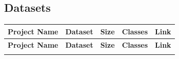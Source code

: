 \documentclass[12pt, titlepage]{article}
\begin{document}
\newpage
\begin{landscape}
\subsection{Datasets}
\begin{longtable}{|l|p{3.5cm}|p{1.8cm}|p{6cm}|p{4cm}|}
\hline
\textbf{Project Name}   & \textbf{Dataset}                                                                                             & \textbf{Size}                                              & \textbf{Classes}                                                                                                                                                                                                                                                                                              & \textbf{Link}                                                   \\ \hline
\endfirsthead
\hline
\textbf{Project Name}   & \textbf{Dataset}                                                                                             & \textbf{Size}                                              & \textbf{Classes}                                                                                                                                                                                                                                                                                              & \textbf{Link}                                                   \\ \hline
\endhead
\hline
\endfoot


\end{longtable}
\end{landscape}
\end{document}
